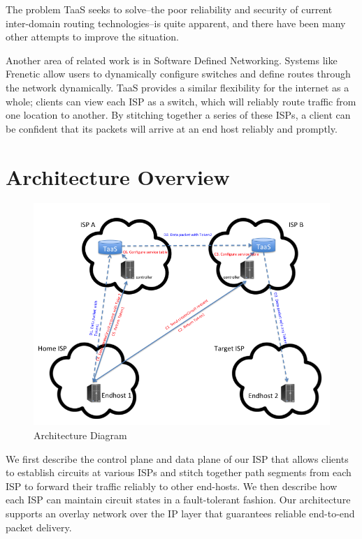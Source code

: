 \documentclass{article}
\begin{document}
The problem TaaS seeks to solve--the poor reliability and security of
current inter-domain routing technologies--is quite apparent, and
there have been many other attempts to improve the situation.

Another area of related work is in Software Defined
Networking. Systems like Frenetic \cite{frenetic} allow users to
dynamically configure switches and define routes through the network
dynamically. TaaS provides a similar flexibility for the internet as a
whole; clients can view each ISP as a switch, which will reliably
route traffic from one location to another. By stitching together a
series of these ISPs, a client can be confident that its packets will
arrive at an end host reliably and promptly.

\section{Architecture Overview}
\begin{figure}
\includegraphics[width=\linewidth]{diagram}
\caption{Architecture Diagram}
\label{fig:diagram}
\end{figure}

We first describe the control plane and data plane of our ISP that
allows clients to establish circuits at various ISPs and stitch
together path segments from each ISP to forward their traffic reliably
to other end-hosts. We then describe how each ISP can maintain circuit
states in a fault-tolerant fashion. Our architecture supports an
overlay network over the IP layer that guarantees reliable end-to-end
packet delivery.
\end{document}
